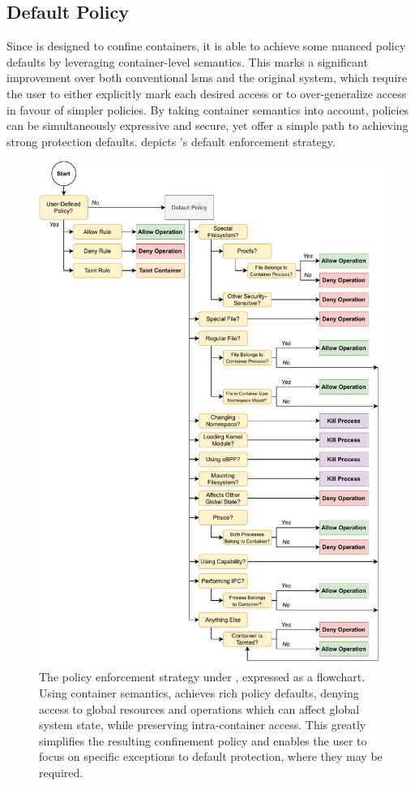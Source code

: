 \subsection{Default Policy}%
\label{ss:bpfcontain-default}

Since \bpfcontain{} is designed to confine containers, it is able to achieve some nuanced
policy defaults by leveraging container-level semantics. This marks a significant
improvement over both conventional \glspl{lsm} and the original \bpfbox{} system, which
require the user to either explicitly mark each desired access or to over-generalize
access in favour of simpler policies. By taking container semantics into account,
\bpfcontain{} policies can be simultaneously expressive and secure, yet offer a simple
path to achieving strong protection defaults.  depicts
\bpfcontain{}'s default enforcement strategy.

\begin{figure}[p]
  \centering
  \includegraphics[width=0.75\linewidth]{figs/bpfcontain/enforcement.pdf}
  \caption[The policy enforcement strategy under \bpfcontain{}]{
    The policy enforcement strategy under \bpfcontain{}, expressed as a flowchart. Using
    container semantics, \bpfcontain{} achieves rich policy defaults, denying access to
    global resources and operations which can affect global system state, while preserving
    intra-container access. This greatly simplifies the resulting confinement policy and
    enables the user to focus on specific exceptions to default protection, where they may
    be required.
  }%
  \label{fig:bpfcontain-enforcement}
\end{figure}

